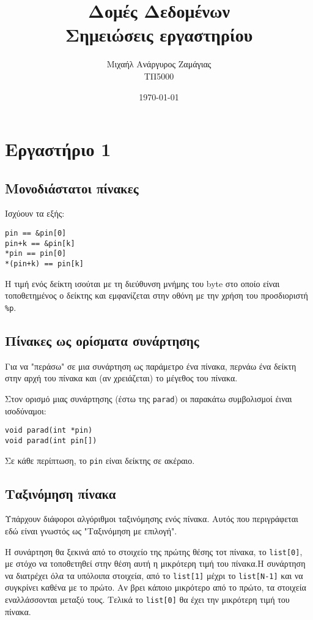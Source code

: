 \documentclass[14pt, fleqn, leqno]{extreport}
\begin{document}
\title{Δομές Δεδομένων\\Σημειώσεις εργαστηρίου}
\author{Μιχαήλ Ανάργυρος Ζαμάγιας\\ΤΠ5000}
\date{\today}
\maketitle
\newpage

\tableofcontents

\newpage
\chapter{Εργαστήριο 1}

\section{Μονοδιάστατοι πίνακες}

Ισχύουν τα εξής:
\begin{lstlisting}
pin == &pin[0]
pin+k == &pin[k]
*pin == pin[0]
*(pin+k) == pin[k]
\end{lstlisting}

Η τιμή ενός δείκτη ισούται με τη διεύθυνση μνήμης του byte στο οποίο είναι τοποθετημένος ο δείκτης και εμφανίζεται στην οθόνη με την χρήση του προσδιοριστή \lstinline{%p}.

\section{Πίνακες ως ορίσματα συνάρτησης}

Για να "περάσω" σε μια συνάρτηση ως παράμετρο ένα πίνακα, περνάω ένα δείκτη στην αρχή του πίνακα και (αν χρειάζεται) το μέγεθος του πίνακα.

Στον ορισμό μιας συνάρτησης (έστω της \lstinline{parad}) οι παρακάτω συμβολισμοί έιναι ισοδύναμοι:
\begin{lstlisting}
void parad(int *pin)
void parad(int pin[])
\end{lstlisting}
Σε κάθε περίπτωση, το \lstinline{pin} είναι δείκτης σε ακέραιο.

\section{Ταξινόμηση πίνακα}

Υπάρχουν διάφοροι αλγόριθμοι ταξινόμησης ενός πίνακα. Αυτός που περιγράφεται εδώ είναι γνωστός ως "Ταξινόμηση με επιλογή".

Η συνάρτηση θα ξεκινά από το στοιχείο της πρώτης θέσης τοτ πίνακα, το \lstinline{list[0]}, με στόχο να τοποθετηθεί στην θέση αυτή η μικρότερη τιμή του πίνακα.Η συνάρτηση να διατρέχει όλα τα υπόλοιπα στοιχεία, από το \lstinline{list[1]} μέχρι το \lstinline{list[Ν-1]} και να συγκρίνει καθένα με το πρώτο. Αν βρει κάποιο μικρότερο από το πρώτο, τα στοιχεία εναλλάσσονται μεταξύ τους. Τελικά το \lstinline{list[0]} θα έχει την μικρότερη τιμή του πίνακα.
\end{document}
